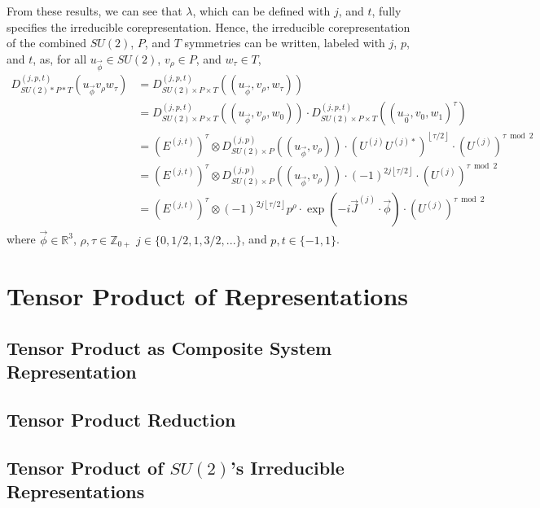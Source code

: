 \documentclass[preprint, 12pt]{revtex4-2}
\numberwithin{equation}{section}
\begin{document}
From these results, we can see that $\lambda$, which can be defined with $j$, and $t$, fully specifies the irreducible corepresentation. Hence, the irreducible corepresentation of the combined $SU(2)$, $P$, and $T$ symmetries can be written, labeled with $j$, $p$, and $t$, as, for all $u_{\vec{\phi}}\in SU(2)$, $v_\rho \in P$, and $w_\tau \in T$,
\begin{equation}\label{eq:SU2*P*T IrCoreps}
    \begin{aligned}
        D^{(j,p,t)}_{SU(2)\ast P\ast T}(u_{\vec{\phi}} v_\rho w_\tau) &= D^{(j,p,t)}_{SU(2)\times P\times T}((u_{\vec{\phi}},v_\rho,w_\tau)) \\
        &= D^{(j,p,t)}_{SU(2)\times P\times T}((u_{\vec{\phi}},v_\rho,w_0))\cdot D^{(j,p,t)}_{SU(2)\times P\times T}((u_{\vec{0}},v_0,w_1)^\tau) \\
        &= \left(E^{(j,t)}\right)^\tau\otimes D_{SU(2)\times P}^{(j,p)}((u_{\vec{\phi}}, v_\rho))\cdot\left(U^{(j)}U^{(j)\ast}\right)^{\left\lfloor \tau/2\right\rfloor}\cdot\left(U^{(j)}\right)^{\tau\bmod 2} \\
        &= \left(E^{(j,t)}\right)^\tau\otimes D_{SU(2)\times P}^{(j,p)}((u_{\vec{\phi}}, v_\rho))\cdot(-1)^{2j\left\lfloor \tau/2\right\rfloor}\cdot\left(U^{(j)}\right)^{\tau\bmod 2} \\
        &= \left(E^{(j,t)}\right)^{\tau}\otimes(-1)^{2j\left\lfloor \tau/2\right\rfloor}p^\rho\cdot\exp(-i\vec{J}^{(j)}\cdot\vec{\phi})\cdot \left(U^{(j)}\right)^{\tau\bmod 2}
    \end{aligned}
\end{equation}
where $\vec{\phi}\in\mathbb{R}^3$, $\rho,\tau\in\mathbb{Z}_{0+}$ $j\in\{0, 1/2, 1, 3/2, ...\}$, and $p, t\in\{-1, 1\}$.

\newpage
\section{Tensor Product of Representations}

\subsection{Tensor Product as Composite System Representation}

\subsection{Tensor Product Reduction}

\subsection{Tensor Product of $SU(2)$'s Irreducible Representations}
\end{document}
